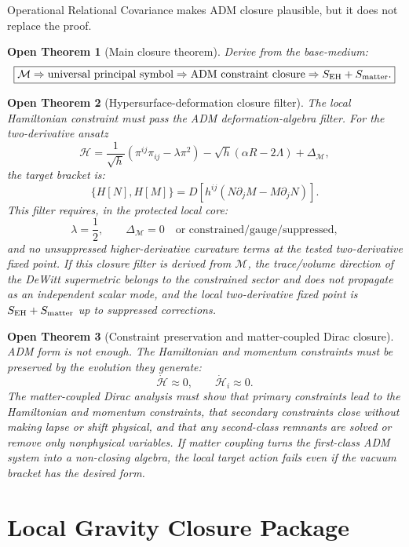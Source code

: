 \documentclass[11pt]{article}
\newtheorem{openthm}{Open Theorem}
\begin{document}
Operational Relational Covariance makes ADM closure plausible, but it does not
replace the proof.

\begin{openthm}[Main closure theorem]
Derive from the base-medium:
\[
\boxed{
\mathcal M
\Rightarrow
\text{universal principal symbol}
\Rightarrow
\text{ADM constraint closure}
\Rightarrow
S_{\rm EH}+S_{\rm matter}.
}
\]
\end{openthm}

\begin{openthm}[Hypersurface-deformation closure filter]
The local Hamiltonian constraint must pass the ADM deformation-algebra filter.
For the two-derivative ansatz
\[
\boxed{
\mathcal H
=
\frac{1}{\sqrt h}
\left(
\pi^{ij}\pi_{ij}-\lambda\pi^2
\right)
-
\sqrt h(\alpha R-2\Lambda)
+
\Delta_{\mathcal M},
}
\]
the target bracket is:
\[
\boxed{
\{H[N],H[M]\}
=
D\!\left[h^{ij}(N\partial_jM-M\partial_jN)\right].
}
\]
This filter requires, in the protected local core:
\[
\boxed{
\lambda=\frac12,
\qquad
\Delta_{\mathcal M}=0
\quad
\text{or constrained/gauge/suppressed},
}
\]
and no unsuppressed higher-derivative curvature terms at the tested
two-derivative fixed point.  If this closure filter is derived from
\(\mathcal M\), the trace/volume direction of the DeWitt supermetric belongs to the
constrained sector and does not propagate as an independent scalar mode, and
the local two-derivative fixed point is \(S_{\rm EH}+S_{\rm matter}\) up to
suppressed corrections.
\end{openthm}

\begin{openthm}[Constraint preservation and matter-coupled Dirac closure]
ADM form is not enough.  The Hamiltonian and momentum constraints must be
preserved by the evolution they generate:
\[
\boxed{
\dot{\mathcal H}\approx0,
\qquad
\dot{\mathcal H}_i\approx0.
}
\]
The matter-coupled Dirac analysis must show that primary constraints lead to
the Hamiltonian and momentum constraints, that secondary constraints close
without making lapse or shift physical, and that any second-class remnants are
solved or remove only nonphysical variables.  If matter coupling turns the
first-class ADM system into a non-closing algebra, the local target action
fails even if the vacuum bracket has the desired form.
\end{openthm}

\section{Local Gravity Closure Package}
\end{document}
